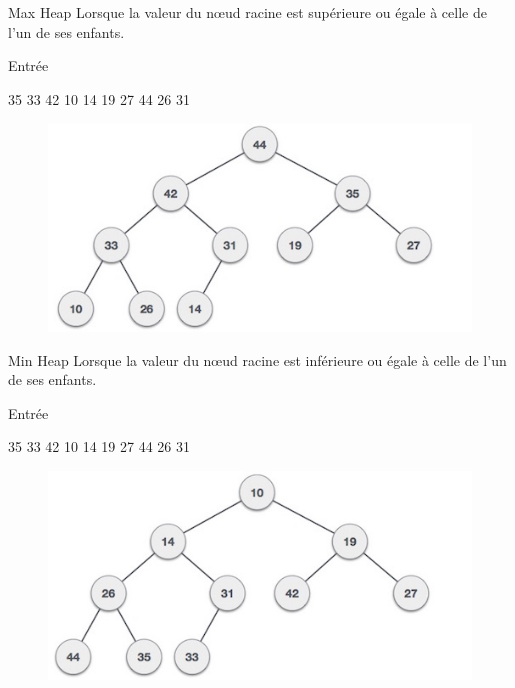 \documentclass[10pt,xcolor=dvipsnames]{beamer}
\newcommand{\defin}[1]{\textcolor{darkspringgreen}{#1}}
\begin{document}
\begin{frame}{Max Heap}
Lorsque la valeur du nœud racine est supérieure ou égale à celle de l'un de ses enfants.
    \begin{exampleblock}{Entrée}
    \begin{center}
            \defin{35 33 42 10 14 19 27 44 26 31}
    \end{center}
    \end{exampleblock}
    
    \begin{figure}
        \centering
        \includegraphics[scale=0.5]{figures/CM3/max_heap_example.jpg}
        \label{fig:my_label}
    \end{figure}
\end{frame}

\begin{frame}{Min Heap}
    Lorsque la valeur du nœud racine est inférieure ou égale à celle de l'un de ses enfants.
        \begin{exampleblock}{Entrée}
    \begin{center}
            \defin{35 33 42 10 14 19 27 44 26 31}
    \end{center}
    \end{exampleblock}
     \begin{figure}
        \centering
        \includegraphics[scale=0.5]{figures/CM3/min_heap_example.jpg}
        \label{fig:my_label}
    \end{figure}
\end{frame}
\end{document}
